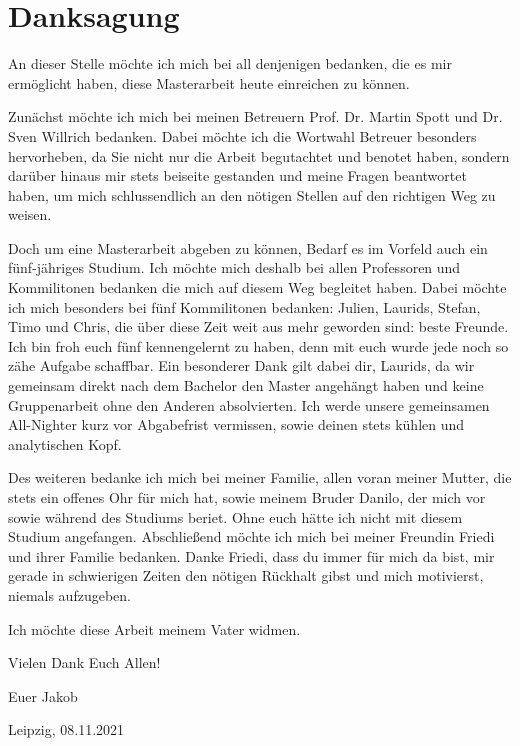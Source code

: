 \clearpage \section*{Danksagung}

\indent An dieser Stelle möchte ich mich bei all denjenigen bedanken, die es mir ermöglicht haben, diese Masterarbeit heute einreichen zu können.

Zunächst möchte ich mich bei meinen Betreuern Prof. Dr. Martin Spott und Dr. Sven Willrich bedanken. Dabei möchte ich die Wortwahl Betreuer besonders hervorheben, da Sie nicht nur die Arbeit begutachtet und benotet haben, sondern darüber hinaus mir stets beiseite gestanden und meine Fragen beantwortet haben, um mich schlussendlich an den nötigen Stellen auf den richtigen Weg zu weisen. 

Doch um eine Masterarbeit abgeben zu können, Bedarf es im Vorfeld auch ein fünf-jähriges Studium. Ich möchte mich deshalb bei allen Professoren und Kommilitonen bedanken die mich auf diesem Weg begleitet haben. Dabei möchte ich mich besonders bei fünf Kommilitonen bedanken: Julien, Laurids, Stefan, Timo und Chris, die über diese Zeit weit aus mehr geworden sind: beste Freunde. Ich bin froh euch fünf kennengelernt zu haben, denn mit euch wurde jede noch so zähe Aufgabe schaffbar.
Ein besonderer Dank gilt dabei dir, Laurids, da wir gemeinsam direkt nach dem Bachelor den Master angehängt haben und keine Gruppenarbeit ohne den Anderen absolvierten. Ich werde unsere gemeinsamen All-Nighter kurz vor Abgabefrist vermissen, sowie deinen stets kühlen und analytischen Kopf. 

Des weiteren bedanke ich mich bei meiner Familie, allen voran meiner Mutter, die stets ein offenes Ohr für mich hat, sowie meinem Bruder Danilo, der mich vor sowie während des Studiums beriet. Ohne euch hätte ich nicht mit diesem Studium angefangen.
Abschließend möchte ich mich bei meiner Freundin Friedi und ihrer Familie bedanken. Danke Friedi, dass du immer für mich da bist, mir gerade in schwierigen Zeiten den nötigen Rückhalt gibst und mich motivierst, niemals aufzugeben.

\vspace{15pt}

{\parindent0pt

Ich möchte diese Arbeit meinem Vater widmen.

\begin{flushright}
Vielen Dank Euch Allen!

Euer Jakob

Leipzig, 08.11.2021
\end{flushright}
}